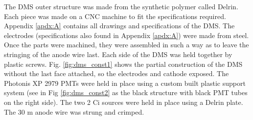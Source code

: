 The DMS outer structure was made from the synthetic polymer called Delrin. Each piece was made on a CNC machine to fit the specifications required. Appendix \ref{apdx:A} contains all drawings and specifications of the DMS. The electrodes (specifications also found in Appendix \ref{apdx:A}) were made from steel. Once the parts were machined, they were assembled in such a way as to leave the stringing of the anode wire last. Each side of the DMS was held together by plastic screws. Fig. \ref{fig:dms_const1} shows the partial construction of the DMS without the last face attached, so the electrodes and cathode exposed. The Photonis XP 2979 PMTs were held in place using a custom built plastic support system (see in Fig \ref{fig:dms_const2} as the black structure with black PMT tubes on the right side). The two 2 \textmu Ci sources were held in place using a Delrin plate. The 30 \textmu m anode wire was strung and crimped. 

